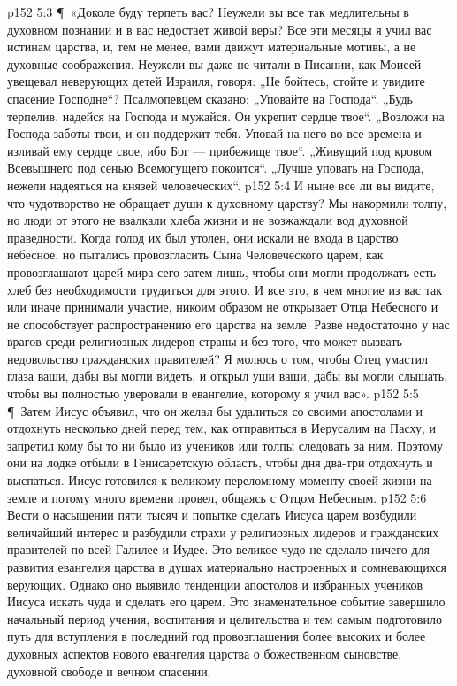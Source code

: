 \vs p152 5:3 \P\ «Доколе буду терпеть вас? Неужели вы все так медлительны в духовном познании и в вас недостает живой веры? Все эти месяцы я учил вас истинам царства, и, тем не менее, вами движут материальные мотивы, а не духовные соображения. Неужели вы даже не читали в Писании, как Моисей увещевал неверующих детей Израиля, говоря: „Не бойтесь, стойте и увидите спасение Господне“? Псалмопевцем сказано: „Уповайте на Господа“. „Будь терпелив, надейся на Господа и мужайся. Он укрепит сердце твое“. „Возложи на Господа заботы твои, и он поддержит тебя. Уповай на него во все времена и изливай ему сердце свое, ибо Бог --- прибежище твое“. „Живущий под кровом Всевышнего под сенью Всемогущего покоится“. „Лучше уповать на Господа, нежели надеяться на князей человеческих“.
\vs p152 5:4 И ныне все ли вы видите, что чудотворство не обращает души к духовному царству? Мы накормили толпу, но люди от этого не взалкали хлеба жизни и не возжаждали вод духовной праведности. Когда голод их был утолен, они искали не входа в царство небесное, но пытались провозгласить Сына Человеческого царем, как провозглашают царей мира сего затем лишь, чтобы они могли продолжать есть хлеб без необходимости трудиться для этого. И все это, в чем многие из вас так или иначе принимали участие, никоим образом не открывает Отца Небесного и не способствует распространению его царства на земле. Разве недостаточно у нас врагов среди религиозных лидеров страны и без того, что может вызвать недовольство гражданских правителей? Я молюсь о том, чтобы Отец умастил глаза ваши, дабы вы могли видеть, и открыл уши ваши, дабы вы могли слышать, чтобы вы полностью уверовали в евангелие, которому я учил вас».
\vs p152 5:5 \P\ Затем Иисус объявил, что он желал бы удалиться со своими апостолами и отдохнуть несколько дней перед тем, как отправиться в Иерусалим на Пасху, и запретил кому бы то ни было из учеников или толпы следовать за ним. Поэтому они на лодке отбыли в Генисаретскую область, чтобы дня два\hyp{}три отдохнуть и выспаться. Иисус готовился к великому переломному моменту своей жизни на земле и потому много времени провел, общаясь с Отцом Небесным.
\vs p152 5:6 Вести о насыщении пяти тысяч и попытке сделать Иисуса царем возбудили величайший интерес и разбудили страхи у религиозных лидеров и гражданских правителей по всей Галилее и Иудее. Это великое чудо не сделало ничего для развития евангелия царства в душах материально настроенных и сомневающихся верующих. Однако оно выявило тенденции апостолов и избранных учеников Иисуса искать чуда и сделать его царем. Это знаменательное событие завершило начальный период учения, воспитания и целительства и тем самым подготовило путь для вступления в последний год провозглашения более высоких и более духовных аспектов нового евангелия царства о божественном сыновстве, духовной свободе и вечном спасении.
